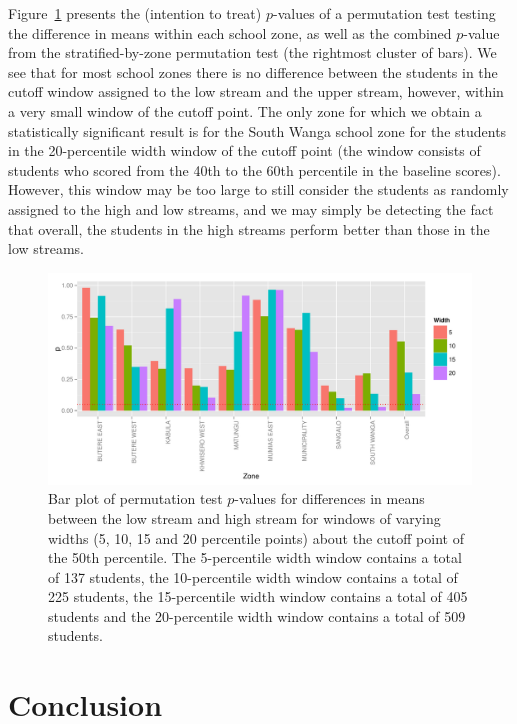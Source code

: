 \documentclass[11pt]{article}
\begin{document}
Figure~\ref{fig:pval_window} presents the (intention to treat) $p$-values of a permutation test testing the difference in means within each school zone, as well as the combined $p$-value from the stratified-by-zone permutation test (the rightmost cluster of bars). We see that for most school zones there is no difference between the students in the cutoff window assigned to the low stream and the upper stream, however, within a very small window of the cutoff point. The only zone for which we obtain a statistically significant result is for the South Wanga school zone for the students in the 20-percentile width window of the cutoff point (the window consists of students who scored from the 40th to the 60th percentile in the baseline scores). However, this window may be too large to still consider the students as randomly assigned to the high and low streams, and we may simply be detecting the fact that overall, the students in the high streams perform better than those in the low streams. 
 
  \begin{figure}[H]
 \centering
 \includegraphics[scale=0.6]{RD_pval.pdf}
 \caption{Bar plot of permutation test $p$-values for differences in means between the low stream and high stream for windows of varying widths (5, 10, 15 and 20 percentile points) about the cutoff point of the 50th percentile. The 5-percentile width window contains a total of 137 students, the 10-percentile width window contains a total of 225 students, the 15-percentile width window contains a total of 405 students and the 20-percentile width window contains a total of 509 students.}
 \label{fig:pval_window}
 \end{figure}
 
 
 
 
 
 
 \section{Conclusion}
 
 
 

 
\end{document}
